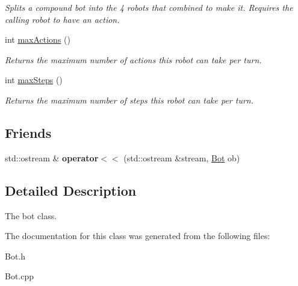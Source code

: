 \begin{DoxyCompactItemize}
\begin{DoxyCompactList}\small\item\em Splits a compound bot into the 4 robots that combined to make it. Requires the calling robot to have an action. \item\end{DoxyCompactList}\item 
\hypertarget{classBot_a49f602d6258372ec647d53aa3fc6f85f}{
int \hyperlink{classBot_a49f602d6258372ec647d53aa3fc6f85f}{maxActions} ()}
\label{classBot_a49f602d6258372ec647d53aa3fc6f85f}

\begin{DoxyCompactList}\small\item\em Returns the maximum number of actions this robot can take per turn. \item\end{DoxyCompactList}\item 
\hypertarget{classBot_a620c2dc2c13fc027e1611c2d84b655b7}{
int \hyperlink{classBot_a620c2dc2c13fc027e1611c2d84b655b7}{maxSteps} ()}
\label{classBot_a620c2dc2c13fc027e1611c2d84b655b7}

\begin{DoxyCompactList}\small\item\em Returns the maximum number of steps this robot can take per turn. \item\end{DoxyCompactList}\end{DoxyCompactItemize}
\subsection*{Friends}
\begin{DoxyCompactItemize}
\item 
\hypertarget{classBot_a3651bfa118ec5110648a3804b2dfaca4}{
std::ostream \& {\bfseries operator$<$$<$} (std::ostream \&stream, \hyperlink{classBot}{Bot} ob)}
\label{classBot_a3651bfa118ec5110648a3804b2dfaca4}

\end{DoxyCompactItemize}


\subsection{Detailed Description}
The bot class. 

The documentation for this class was generated from the following files:\begin{DoxyCompactItemize}
\item 
Bot.h\item 
Bot.cpp\end{DoxyCompactItemize}
